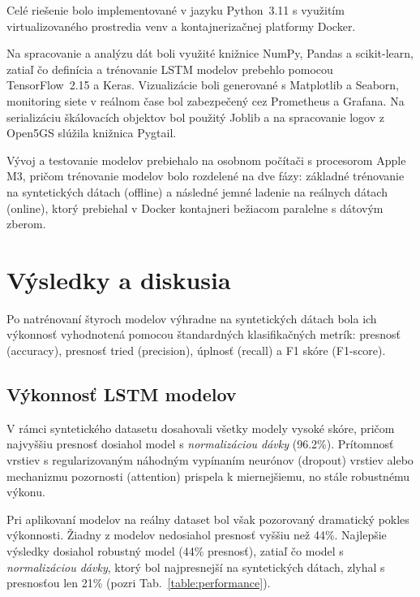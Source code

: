 \documentclass[a4paper,10pt]{ieeetran}
\begin{document}
Celé riešenie bolo implementované v jazyku Python~3.11 s využitím virtualizovaného prostredia venv a kontajnerizačnej platformy Docker.

Na spracovanie a analýzu dát boli využité knižnice NumPy, Pandas a scikit-learn, zatiaľ čo definícia a trénovanie LSTM modelov prebehlo pomocou TensorFlow~2.15 a Keras. Vizualizácie boli generované s Matplotlib a Seaborn, monitoring siete v reálnom čase bol zabezpečený cez Prometheus a Grafana. Na serializáciu škálovacích objektov bol použitý Joblib a na spracovanie logov z Open5GS slúžila knižnica Pygtail.


Vývoj a testovanie modelov prebiehalo na osobnom počítači s procesorom Apple M3, pričom trénovanie modelov bolo rozdelené na dve fázy: základné trénovanie na syntetických dátach (offline) a následné jemné ladenie na reálnych dátach (online), ktorý prebiehal v Docker kontajneri bežiacom paralelne s dátovým zberom. 


\section{Výsledky a diskusia}
\label{sec_results}

Po natrénovaní štyroch modelov výhradne na syntetických dátach bola ich výkonnosť vyhodnotená pomocou štandardných klasifikačných metrík: presnosť (accuracy), presnosť tried (precision), úplnosť (recall) a F1 skóre (F1-score).

\subsection{Výkonnosť LSTM modelov}

V rámci syntetického datasetu dosahovali všetky modely vysoké skóre, pričom najvyššiu presnosť dosiahol model s \textit{normalizáciou dávky} (96.2\%). Prítomnosť vrstiev s regularizovaným náhodným vypínaním neurónov (dropout) vrstiev alebo mechanizmu pozornosti (attention) prispela k miernejšiemu, no stále robustnému výkonu.

Pri aplikovaní modelov na reálny dataset bol však pozorovaný dramatický pokles výkonnosti. Žiadny z modelov nedosiahol presnosť vyššiu než 44\%. Najlepšie výsledky dosiahol robustný model (44\% presnosť), zatiaľ čo model s \textit{normalizáciou dávky}, ktorý bol najpresnejší na syntetických dátach, zlyhal s presnosťou len 21\% (pozri Tab.~\ref{table:performance}).
\end{document}
